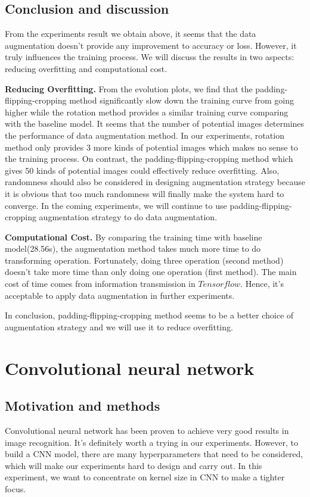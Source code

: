 \documentclass[]{article}
\begin{document}
\subsection{Conclusion and discussion}
From the experiments result we obtain above, it seems that the data augmentation doesn't provide any improvement to accuracy or loss. However, it truly influences the training process. We will discuss the results in two aspects: reducing overfitting and computational cost.

\textbf{Reducing Overfitting.} From the evolution plots, we find that the padding-flipping-cropping method significantly slow down the training curve from going higher while the rotation method provides a similar training curve comparing with the baseline model. It seems that the number of potential images determines the performance of data augmentation method. In our experiments, rotation method only provides 3 more kinds of potential images which makes no sense to the training process. On contrast, the padding-flipping-cropping method which gives 50 kinds of potential images could effectively reduce overfitting. Also, randomness should also be considered in designing augmentation strategy because it is obvious that too much randomness will finally make the system hard to converge. In the coming experiments, we will continue to use padding-flipping-cropping augmentation strategy to do data augmentation.

\textbf{Computational Cost.} By comparing the training time with baseline model(28.56s), the augmentation method takes much more time to do transforming operation. Fortunately, doing three operation (second method) doesn't take more time than only doing one operation (first method). The main cost of time comes from information transmission in $Tensorflow$. Hence, it's acceptable to apply data augmentation in further experiments.

In conclusion, padding-flipping-cropping method seems to be a better choice of augmentation strategy and we will use it to reduce overfitting.
 
\section{Convolutional neural network}
\subsection{Motivation and methods}
Convolutional neural network has been proven to achieve very good results in image recognition. It's definitely worth a trying in our experiments. However, to build a CNN model, there are many hyperparameters that need to be considered, which will make our experiments hard to design and carry out. In this experiment, we want to concentrate on kernel size in CNN to make a tighter focus. 
\end{document}
